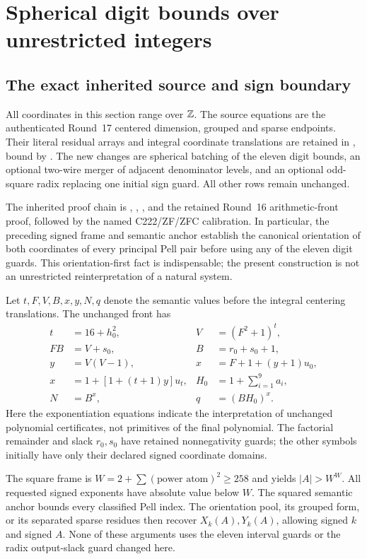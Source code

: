 \section{Spherical digit bounds over unrestricted integers}
\label{sec:signed}
\subsection{The exact inherited source and sign boundary}
All coordinates in this section range over $\mathbb Z$. The source equations are
the authenticated Round~17 centered dimension, grouped and sparse endpoints.
Their literal residual arrays and integral coordinate translations are
retained in , bound by .
The new changes are spherical batching of the eleven digit bounds, an
optional two-wire merger of adjacent denominator levels, and an optional
odd-square radix replacing one initial sign guard. All other rows remain
unchanged.

The inherited proof chain is ,
, , and the retained
Round~16 arithmetic-front proof, followed by the named C222/ZF/ZFC
calibration. In particular, the preceding signed frame and semantic
anchor establish the canonical orientation of both coordinates of every
principal Pell pair before using any of the eleven digit guards. This
orientation-first fact is indispensable; the present construction is not
an unrestricted reinterpretation of a natural system.

Let $t,F,V,B,x,y,N,q$ denote the semantic values before the integral
centering translations. The unchanged front has
\begin{align}
 t&=16+h_0^2,& V&=(F^2+1)^t,\\
 FB&=V+s_0,& B&=r_0+s_0+1,\\
 y&=V(V-1),& x&=F+1+(y+1)u_0,\\
 x&=1+[1+(t+1)y]u_t,& H_0&=1+\sum_{i=1}^{9}a_i,\\
 N&=B^x,& q&=(BH_0)^x.
\end{align}
Here the exponentiation equations indicate the interpretation of unchanged
polynomial certificates, not primitives of the final polynomial.
The factorial remainder and slack $r_0,s_0$ have retained nonnegativity
guards; the other symbols initially have only their declared signed
coordinate domains.

The square frame is $W=2+\sum(\text{power atom})^2\ge258$ and yields
$|A|>W^W$. All requested signed exponents have absolute value below $W$.
The squared semantic anchor bounds every classified Pell index. The
orientation pool, its grouped form, or its separated sparse residues then
recover $X_k(A),Y_k(A)$, allowing signed $k$ and signed $A$.
None of these arguments uses the eleven interval guards or the radix
output-slack guard changed here.

